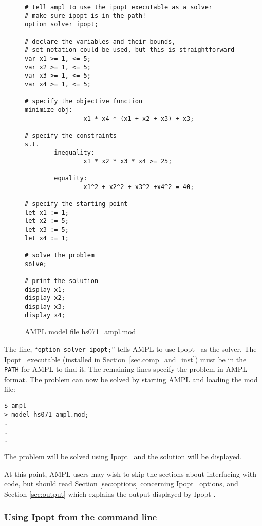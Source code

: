 \documentclass[10pt]{article}
\newcommand{\Ipopt}{{\sc Ipopt }}
\begin{document}
\begin{figure}
  \centering
\begin{footnotesize}
\begin{verbatim}
# tell ampl to use the ipopt executable as a solver
# make sure ipopt is in the path!
option solver ipopt;

# declare the variables and their bounds, 
# set notation could be used, but this is straightforward
var x1 >= 1, <= 5; 
var x2 >= 1, <= 5; 
var x3 >= 1, <= 5; 
var x4 >= 1, <= 5;

# specify the objective function
minimize obj:
                x1 * x4 * (x1 + x2 + x3) + x3;
        
# specify the constraints
s.t.
        inequality:
                x1 * x2 * x3 * x4 >= 25;
                
        equality:
                x1^2 + x2^2 + x3^2 +x4^2 = 40;

# specify the starting point            
let x1 := 1;
let x2 := 5;
let x3 := 5;
let x4 := 1;

# solve the problem
solve;

# print the solution
display x1;
display x2;
display x3;
display x4;
\end{verbatim}
\end{footnotesize}
  
  \caption{AMPL model file hs071\_ampl.mod}
  \label{fig:HS71}
\end{figure}

The line, ``{\tt option solver ipopt;}'' tells AMPL to use \Ipopt\ as
the solver. The \Ipopt\ executable (installed in
Section~\ref{sec.comp_and_inst}) must be in the {\tt PATH} for AMPL to
find it. The remaining lines specify the problem in AMPL format. The
problem can now be solved by starting AMPL and loading the mod file:
\begin{verbatim}
$ ampl
> model hs071_ampl.mod;
.
.
.
\end{verbatim}
The problem will be solved using \Ipopt\ and the solution will be
displayed.

At this point, AMPL users may wish to skip the sections about
interfacing with code, but should read Section \ref{sec:options}
concerning \Ipopt\ options, and Section \ref{sec:output} which
explains the output displayed by \Ipopt.

\subsubsection{Using Ipopt from the command line}
\end{document}
